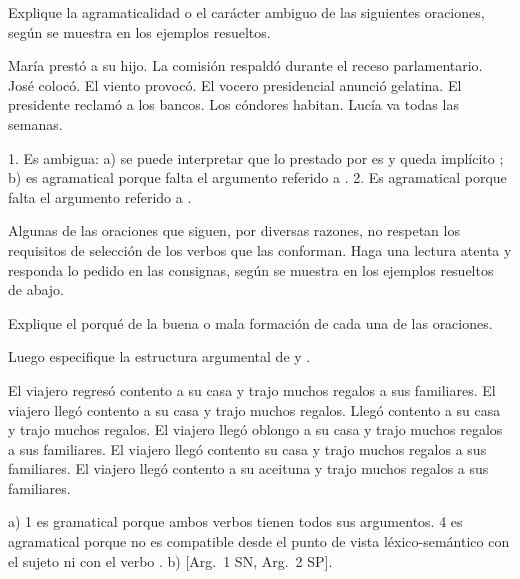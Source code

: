 \begin{ejercicio}\label{ej:07-agramatical}
Explique la agramaticalidad o el carácter ambiguo de las siguientes oraciones,
según se muestra en los ejemplos resueltos.

\begin{exe}
  \ex María prestó a su hijo.
  \ex La comisión respaldó durante el receso parlamentario.
  \ex José colocó.
  \ex El viento provocó.
  \ex El vocero presidencial anunció gelatina.
  \ex El presidente reclamó a los bancos.
  \ex Los cóndores habitan.
  \ex Lucía va todas las semanas.
\end{exe}

\begin{resuelto}
1. Es ambigua: a) se puede interpretar que lo prestado por  es
 y queda implícito ; b) es agramatical porque falta
el argumento referido a . 2. Es
agramatical porque falta el argumento referido a .
\end{resuelto}
\end{ejercicio}

\begin{ejercicio}\label{ej:07-seleccion}
Algunas de las oraciones que siguen, por diversas razones, no respetan los
requisitos de selección de los verbos que las conforman. Haga una lectura atenta
y responda lo pedido en las consignas, según se muestra en los ejemplos
resueltos de abajo.

\begin{consignas}
  \item Explique el porqué de la buena o mala formación de cada una de las
        oraciones.
  \item Luego especifique la estructura argumental de  y
        .
\end{consignas}

\begin{exe}
  \ex El viajero regresó contento a su casa y trajo muchos regalos a sus
      familiares.
  \ex El viajero llegó contento a su casa y trajo muchos regalos.
  \ex Llegó contento a su casa y trajo muchos regalos.
  \ex El viajero llegó oblongo a su casa y trajo muchos regalos a sus familiares.
  \ex El viajero llegó contento su casa y trajo muchos regalos a sus familiares.
  \ex El viajero llegó contento a su aceituna y trajo muchos regalos a sus
      familiares.
\end{exe}

\begin{resuelto}
a) 1 es gramatical porque ambos verbos tienen todos sus argumentos. 4 es
agramatical porque  no es compatible desde el punto de vista
léxico-semántico con el sujeto ni con el verbo . b)
 [Arg.~1 SN, Arg.~2 SP].
\end{resuelto}
\end{ejercicio}

